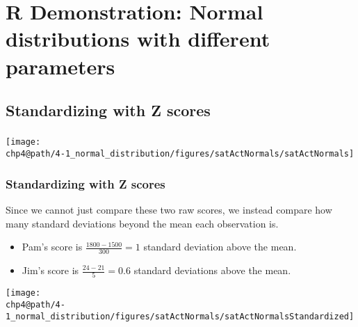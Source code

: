 \documentclass[slidestop,compress,mathserif]{beamer}
\makeatletter
\def\chp4@path{../../Chp 4}
\makeatother
\begin{document}


\section{R Demonstration: Normal distributions with different parameters}


\subsection{Standardizing with Z scores}


\begin{frame}
\frametitle{}


\begin{center}
\texttt{[image: \\chp4@path/4-1\_normal\_distribution/figures/satActNormals/satActNormals]}
\end{center}

\end{frame}


\begin{frame}
\frametitle{Standardizing with Z scores}

Since we cannot just compare these two raw scores, we instead compare how many standard deviations beyond the mean each observation is.

\begin{itemize}

\item Pam's score is $\frac{1800 - 1500}{300} = 1$ standard deviation above the mean.

\item Jim's score is $\frac{24 - 21}{5} = 0.6$ standard deviations above the mean.

\end{itemize}

\begin{center}
\texttt{[image: \\chp4@path/4-1\_normal\_distribution/figures/satActNormals/satActNormalsStandardized]}
\end{center}

\end{frame}
\end{document}

